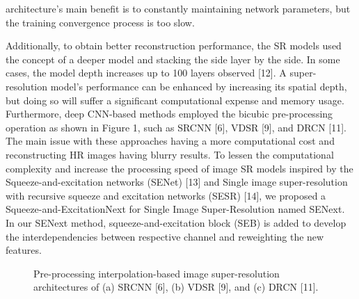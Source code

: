 \documentclass{ieeeaccess}
\begin{document}
architecture's main benefit is to constantly maintaining network parameters, but the training convergence process is too slow.

Additionally, to obtain better reconstruction performance, the SR models used the concept of a deeper model and stacking the side layer by the side. In some cases, the model depth increases up to 100 layers observed [12]. A super-resolution model's performance can be enhanced by increasing its spatial depth, but doing so will suffer a significant computational expense and memory usage. Furthermore, deep CNN-based methods employed the bicubic pre-processing operation as shown in Figure 1, such as SRCNN [6], VDSR [9], and DRCN [11]. The main issue with these approaches having a more computational cost and reconstructing HR images having blurry results. To lessen the computational complexity and increase the processing speed of image SR models inspired by the Squeeze-and-excitation networks (SENet) [13] and Single image super-resolution with recursive squeeze and excitation networks (SESR) [14], we proposed a Squeeze-and-ExcitationNext for Single Image Super-Resolution named SENext. In our SENext method, squeeze-and-excitation block (SEB) is added to  develop the interdependencies between respective channel and reweighting  the new features.


\begin{figure}

    \centering
    \newlength{\xfigwd}
    \caption {Pre-processing interpolation-based image super-resolution architectures of (a) SRCNN [6], (b) VDSR [9], and (c) DRCN [11].}

    \label{fig1}

\end{figure}
\end{document}
